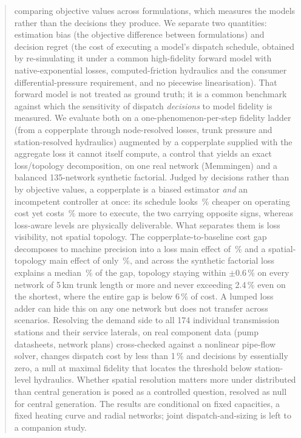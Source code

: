 \documentclass[a4paper,fleqn]{cas-sc}
\begin{document}
\begin{abstract}
comparing objective values across formulations, which measures the models rather than
the decisions they produce. We separate two quantities: estimation bias (the objective
difference between formulations) and decision regret (the cost of executing a model's
dispatch schedule, obtained by re-simulating it under a common high-fidelity forward
model with native-exponential losses, computed-friction hydraulics and the consumer
differential-pressure requirement, and no piecewise linearisation). That forward model is
not treated as ground truth; it is a common benchmark against which the sensitivity of
dispatch \emph{decisions} to model fidelity is measured. We evaluate both on
a one-phenomenon-per-step fidelity ladder (from a copperplate through node-resolved
losses, trunk pressure and station-resolved hydraulics) augmented by a copperplate
supplied with the aggregate loss it cannot itself compute, a control that yields an
exact loss/topology decomposition, on one real network (Memmingen) and a balanced
135-network synthetic factorial. Judged by decisions rather than by objective values, a
copperplate is a biased estimator \emph{and} an incompetent controller at once: its
schedule looks \,\% cheaper on operating cost yet costs
\,\% more to execute, the two carrying opposite signs, whereas
loss-aware levels are physically deliverable. What separates them is loss visibility, not
spatial topology. The copperplate-to-baseline cost gap decomposes to machine precision into
a loss main effect of \,\% and a spatial-topology main effect of only
\,\%, and across the synthetic factorial loss explains a median
\,\% of the gap, topology staying within
$\pm$0.6\,\% on every network of 5\,km trunk length or more and never exceeding 2.4\,\% even
on the shortest, where the entire gap is below 6\,\% of cost. A lumped loss adder can hide
this on any one network but does not transfer across scenarios. Resolving the demand side to all 174
individual transmission stations and their service laterals, on real component data (pump
datasheets, network plans) cross-checked against a nonlinear pipe-flow solver, changes
dispatch cost by less than 1\,\% and decisions by essentially zero, a null at maximal
fidelity that locates the threshold below station-level hydraulics. Whether spatial
resolution matters more under distributed than central generation is posed as a controlled
question, resolved as null for central generation. The results are conditional on fixed
capacities, a fixed heating curve and radial networks; joint dispatch-and-sizing is left
to a companion study.
\end{abstract}
\end{document}
